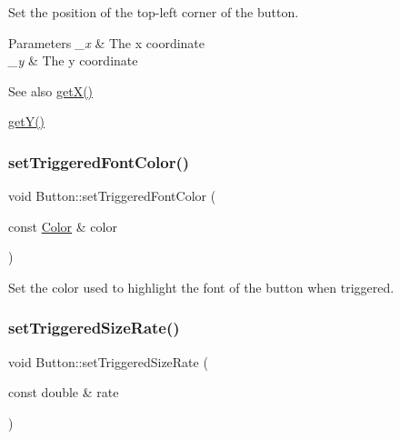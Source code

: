 Set the position of the top-\/left corner of the button. 


\begin{DoxyParams}{Parameters}
{\em \+\_\+x} & The x coordinate \\
\hline
{\em \+\_\+y} & The y coordinate \\
\hline
\end{DoxyParams}
\begin{DoxySeeAlso}{See also}
\mbox{\hyperlink{class_button_a05c6aae1cf037ad66e3821963fe72988}{get\+X()}} 

\mbox{\hyperlink{class_button_a3acf216100c43b999e38047bfdf99ee7}{get\+Y()}} 
\end{DoxySeeAlso}
\mbox{\label{class_button_a2e15e337fa9b03c765974215b24787ba}} 
\subsubsection{\texorpdfstring{set\+Triggered\+Font\+Color()}{setTriggeredFontColor()}}
{\footnotesize\ttfamily void Button\+::set\+Triggered\+Font\+Color (\begin{DoxyParamCaption}\item[{const \mbox{\hyperlink{class_color}{Color}} \&}]{color }\end{DoxyParamCaption})\hspace{0.3cm}{\ttfamily [inline]}}



Set the color used to highlight the font of the button when triggered. 

\mbox{\label{class_button_a632e041a4c2f31df0930b6024ffa7f3e}} 
\subsubsection{\texorpdfstring{set\+Triggered\+Size\+Rate()}{setTriggeredSizeRate()}}
{\footnotesize\ttfamily void Button\+::set\+Triggered\+Size\+Rate (\begin{DoxyParamCaption}\item[{const double \&}]{rate }\end{DoxyParamCaption})\hspace{0.3cm}{\ttfamily [inline]}}



